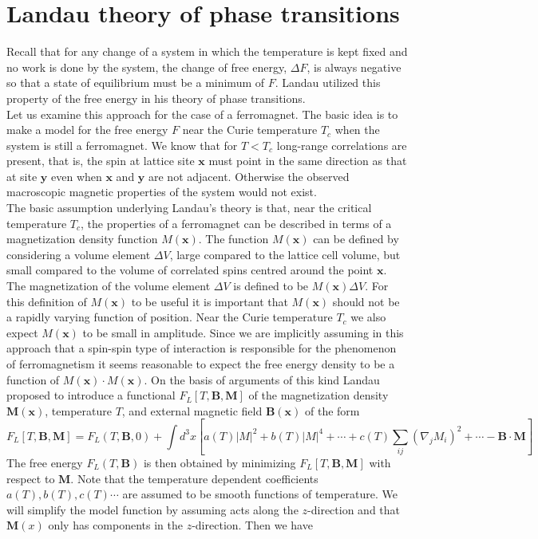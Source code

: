 \documentclass[cyan]{elegantnote}
\begin{document}
\section{Landau theory of phase transitions}
Recall that for any change of a system in which the temperature is kept fixed and no work is done by the system, the change of free energy, $\Delta F$, is always negative so that a state of equilibrium must be a minimum of $F$. Landau utilized this property of the free energy in his theory of phase transitions.
\\
Let us examine this approach for the case of a ferromagnet. The basic idea is to make a model for the free energy $F$ near the Curie temperature $T_c$ when the system is still a ferromagnet. We know that for $T < T_c$ long-range correlations are present, that is, the spin at lattice site $\bm{x}$ must point in the same direction as that at site $\bm{y}$ even when $\bm{x}$ and $\bm{y}$ are not adjacent. Otherwise the observed macroscopic magnetic properties of the system would not exist.
\\
The basic assumption underlying Landau's theory is that, near the critical temperature $T_c$, the properties of a ferromagnet can be described in terms of a magnetization density function $M(\bm{x})$. 
The function $M(\bm{x})$ can be defined by considering a volume element $\Delta V$, large compared to the lattice cell volume, but small compared to the volume of correlated spins centred around the point $\bm{x}$. 
The magnetization of the volume element $\Delta V$ is defined to be $M(\bm{x}) \Delta V$. For this definition of $M(\bm{x})$ to be useful it is important that $M(\bm{x})$ should not be a rapidly varying function of position. Near the Curie temperature $T_c$ we also expect $M(\bm{x})$ to be small in amplitude. 
Since we are implicitly assuming in this approach that a spin-spin type of interaction is responsible for the phenomenon of ferromagnetism it seems reasonable to expect the free energy density to be a function of $M(\bm{x})\cdot M(\bm{x})$. On the basis of arguments of this kind Landau proposed to introduce a functional $F_L[T,\bm{B},\bm{M}]$ of the magnetization density $\bm{M}(\bm{x})$, temperature $T$, and external magnetic field $\bm{B}(\bm{x})$ of the form
\[F_L[T,\bm{B},\bm{M}] = F_L(T,\bm{B},0) + \int d^3x \left[ a(T)|M|^2 + b(T)|M|^4 + \cdots + c(T)\sum_{ij} (\nabla_jM_i)^2 + \cdots - \bm{B}\cdot\bm{M} \right]\]
The free energy $F_L(T,\bm{B})$ is then obtained by minimizing $F_L[T,\bm{B},\bm{M}]$ with respect to $\bm{M}$. Note that the temperature dependent coefficients $a(T), b(T), c(T) \cdots$ are assumed to be smooth functions of temperature. We will simplify the model function by assuming  acts along the $z$-direction and that $\bm{M}(x)$ only has components in the $z$-direction. Then we have
\end{document}
